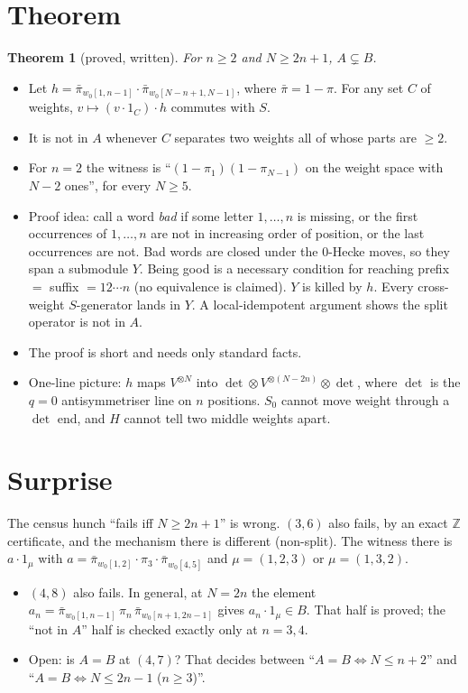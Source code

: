 \documentclass[11pt]{amsart}
\newcommand{\gr}[1]{\textsf{#1}}
\newcommand{\pb}{\bar\pi}
\newcommand{\wo}{w_0}
\newcommand{\ZZ}{\mathbb{Z}}
\theoremstyle{plain}
\newtheorem{theorem}{Theorem}
\theoremstyle{definition}
\begin{document}
\section{Theorem}
\begin{theorem}[\gr{proved, written}]\label{thm:main}
For $n\ge2$ and $N\ge2n+1$, $A\subsetneq B$.
\end{theorem}
\begin{itemize}[leftmargin=1.2em,itemsep=2pt]
\item Let $h=\pb_{\wo[1,n-1]}\cdot\pb_{\wo[N-n+1,N-1]}$, where $\pb=1-\pi$. For any set $C$ of weights, $v\mapsto(v\cdot1_C)\cdot h$ commutes with $S$.
\item It is not in $A$ whenever $C$ separates two weights all of whose parts are $\ge2$.
\item For $n=2$ the witness is ``$(1-\pi_1)(1-\pi_{N-1})$ on the weight space with $N-2$ ones'', for every $N\ge5$.
\item Proof idea: call a word \emph{bad} if some letter $1,\dots,n$ is missing, or the first occurrences of $1,\dots,n$ are not in increasing order of position, or the last occurrences are not. Bad words are closed under the $0$-Hecke moves, so they span a submodule $Y$. Being good is a necessary condition for reaching prefix $=$ suffix $=12\cdots n$ (no equivalence is claimed). $Y$ is killed by $h$. Every cross-weight $S$-generator lands in $Y$. A local-idempotent argument shows the split operator is not in $A$.
\item The proof is short and needs only standard facts.
\item One-line picture: $h$ maps $V^{\otimes N}$ into $\det\otimes V^{\otimes(N-2n)}\otimes\det$, where $\det$ is the $q=0$ antisymmetriser line on $n$ positions. $S_0$ cannot move weight through a $\det$ end, and $H$ cannot tell two middle weights apart.
\end{itemize}

\section{Surprise}\label{sec:surprise}
The census hunch ``fails iff $N\ge2n+1$'' is wrong. $(3,6)$ also fails, by an exact $\ZZ$ certificate, and the mechanism there is different (non-split).
The witness there is $a\cdot1_\mu$ with $a=\pb_{\wo[1,2]}\cdot\pi_3\cdot\pb_{\wo[4,5]}$ and $\mu=(1,2,3)$ or $\mu=(1,3,2)$.
\begin{itemize}[leftmargin=1.2em,itemsep=2pt]
\item $(4,8)$ also fails. In general, at $N=2n$ the element $a_n=\pb_{\wo[1,n-1]}\,\pi_n\,\pb_{\wo[n+1,2n-1]}$ gives $a_n\cdot1_\mu\in B$. That half is proved; the ``not in $A$'' half is checked exactly only at $n=3,4$.
\item Open: is $A=B$ at $(4,7)$? That decides between ``$A=B\iff N\le n+2$'' and ``$A=B\iff N\le 2n-1$ ($n\ge3$)''.
\end{itemize}
\end{document}
